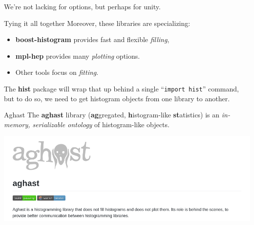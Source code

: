 \documentclass[aspectratio=169]{beamer}
\begin{document}
\begin{frame}{}
\vspace{1 cm}
\Large
\begin{center}
We're not lacking for options, but perhaps for unity.
\end{center}
\end{frame}

\begin{frame}{Tying it all together}
\large
\vspace{0.5 cm}
Moreover, these libraries are specializing:

\vspace{0.35 cm}
\begin{itemize}
\item {\bf boost-histogram} provides fast and flexible {\it filling},
\item {\bf mpl-hep} provides many {\it plotting} options.
\item Other tools focus on {\it fitting}.
\end{itemize}

\vspace{0.35 cm}
The {\bf hist} package will wrap that up behind a single ``\texttt{import hist}'' command, but to do so, we need to get histogram objects from one library to another.
\end{frame}

\begin{frame}{Aghast}
\large
\vspace{0.5 cm}
The {\bf aghast} library ({\bf ag}gregated, {\bf h}istogram-like {\bf st}atistics) is an {\it in-memory, serializable ontology} of histogram-like objects.

\vspace{0.75 cm}
\includegraphics[width=\linewidth]{aghast-github.png}
\end{frame}
\end{document}
